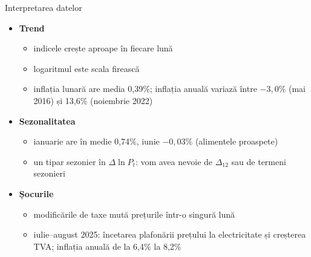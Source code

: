 \begin{frame}{Interpretarea datelor}
\itemsize{\small}
\begin{itemize}
    \item \textbf{Trend}
    \begin{itemize}
        \item indicele crește aproape în fiecare lună
        \item logaritmul este scala firească
        \item inflația lunară are media 0{,}39\%; inflația anuală variază între $\ensuremath{-}3{,}0\%$ (mai 2016) și 13{,}6\% (noiembrie 2022)
    \end{itemize}
    \item \textbf{Sezonalitatea}
    \begin{itemize}
        \item ianuarie are în medie 0{,}74\%, iunie $\ensuremath{-}0{,}03\%$ (alimentele proaspete)
        \item un tipar sezonier în $\Delta\ln P_t$: vom avea nevoie de $\Delta_{12}$ sau de termeni sezonieri
    \end{itemize}
    \item \textbf{Șocurile}
    \begin{itemize}
        \item modificările de taxe mută prețurile într-o singură lună
        \item iulie--august 2025: încetarea plafonării prețului la electricitate și creșterea TVA; inflația anuală de la 6{,}4\% la 8{,}2\%
    \end{itemize}
\end{itemize}
\end{frame}

